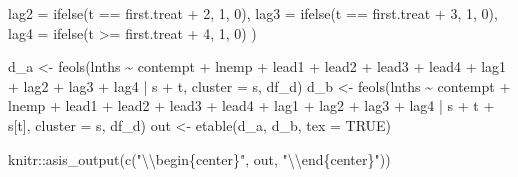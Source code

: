 \documentclass[
]{article}
\newenvironment{Shaded}{\begin{snugshade}}{\end{snugshade}}
\newcommand{\AttributeTok}[1]{\textcolor[rgb]{0.77,0.63,0.00}{#1}}
\newcommand{\ConstantTok}[1]{\textcolor[rgb]{0.00,0.00,0.00}{#1}}
\newcommand{\DecValTok}[1]{\textcolor[rgb]{0.00,0.00,0.81}{#1}}
\newcommand{\FunctionTok}[1]{\textcolor[rgb]{0.00,0.00,0.00}{#1}}
\newcommand{\NormalTok}[1]{#1}
\newcommand{\OtherTok}[1]{\textcolor[rgb]{0.56,0.35,0.01}{#1}}
\newcommand{\SpecialCharTok}[1]{\textcolor[rgb]{0.00,0.00,0.00}{#1}}
\newcommand{\StringTok}[1]{\textcolor[rgb]{0.31,0.60,0.02}{#1}}
\begin{document}
\begin{Shaded}
\begin{Highlighting}[]
    \AttributeTok{lag2 =} \FunctionTok{ifelse}\NormalTok{(t }\SpecialCharTok{==}\NormalTok{ first.treat }\SpecialCharTok{+} \DecValTok{2}\NormalTok{, }\DecValTok{1}\NormalTok{, }\DecValTok{0}\NormalTok{),}
    \AttributeTok{lag3 =} \FunctionTok{ifelse}\NormalTok{(t }\SpecialCharTok{==}\NormalTok{ first.treat }\SpecialCharTok{+} \DecValTok{3}\NormalTok{, }\DecValTok{1}\NormalTok{, }\DecValTok{0}\NormalTok{),}
    \AttributeTok{lag4 =} \FunctionTok{ifelse}\NormalTok{(t }\SpecialCharTok{\textgreater{}=}\NormalTok{ first.treat }\SpecialCharTok{+} \DecValTok{4}\NormalTok{, }\DecValTok{1}\NormalTok{, }\DecValTok{0}\NormalTok{)}
\NormalTok{    )}
  
\NormalTok{d\_a }\OtherTok{\textless{}{-}} \FunctionTok{feols}\NormalTok{(lnths }\SpecialCharTok{\textasciitilde{}}\NormalTok{ contempt }\SpecialCharTok{+}\NormalTok{ lnemp }\SpecialCharTok{+} 
\NormalTok{               lead1 }\SpecialCharTok{+}\NormalTok{ lead2 }\SpecialCharTok{+}\NormalTok{ lead3 }\SpecialCharTok{+}\NormalTok{ lead4 }\SpecialCharTok{+} 
\NormalTok{               lag1 }\SpecialCharTok{+}\NormalTok{ lag2 }\SpecialCharTok{+}\NormalTok{ lag3 }\SpecialCharTok{+}\NormalTok{ lag4 }
               \SpecialCharTok{|}\NormalTok{ s }\SpecialCharTok{+}\NormalTok{ t, }\AttributeTok{cluster =} \StringTok{\textquotesingle{}s\textquotesingle{}}\NormalTok{, df\_d)}
\NormalTok{d\_b }\OtherTok{\textless{}{-}} \FunctionTok{feols}\NormalTok{(lnths }\SpecialCharTok{\textasciitilde{}}\NormalTok{ contempt }\SpecialCharTok{+}\NormalTok{ lnemp }\SpecialCharTok{+} 
\NormalTok{               lead1 }\SpecialCharTok{+}\NormalTok{ lead2 }\SpecialCharTok{+}\NormalTok{ lead3 }\SpecialCharTok{+}\NormalTok{ lead4 }\SpecialCharTok{+} 
\NormalTok{               lag1 }\SpecialCharTok{+}\NormalTok{ lag2 }\SpecialCharTok{+}\NormalTok{ lag3 }\SpecialCharTok{+}\NormalTok{ lag4 }
               \SpecialCharTok{|}\NormalTok{ s }\SpecialCharTok{+}\NormalTok{ t }\SpecialCharTok{+}\NormalTok{ s[t], }\AttributeTok{cluster =} \StringTok{\textquotesingle{}s\textquotesingle{}}\NormalTok{, df\_d)}
\NormalTok{out }\OtherTok{\textless{}{-}} \FunctionTok{etable}\NormalTok{(d\_a, d\_b, }\AttributeTok{tex =} \ConstantTok{TRUE}\NormalTok{) }
\end{Highlighting}
\end{Shaded}

\begin{Shaded}
\begin{Highlighting}[]
\NormalTok{knitr}\SpecialCharTok{::}\FunctionTok{asis\_output}\NormalTok{(}\FunctionTok{c}\NormalTok{(}\StringTok{"}\SpecialCharTok{\textbackslash{}\textbackslash{}}\StringTok{begin\{center\}"}\NormalTok{, out, }\StringTok{"}\SpecialCharTok{\textbackslash{}\textbackslash{}}\StringTok{end\{center\}"}\NormalTok{)) }
\end{Highlighting}
\end{Shaded}
\end{document}
